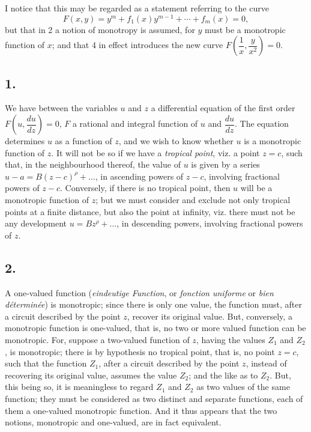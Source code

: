 \documentclass[11pt,a4paper]{article}
\theoremstyle{definition}
\begin{document}
I notice that this may be regarded as a statement referring to the curve
\[
F(x, y) = y^m + f_1(x)y^{m-1} + \cdots + f_m(x) = 0,
\]
but that in 2 a notion of monotropy is assumed, for $y$ must be a monotropic function of $x$; and that 4 in effect introduces the new curve $F\!\left(\dfrac{1}{x}, \dfrac{y}{x^2}\right) = 0$.

\subsection*{1.}

We have between the variables $u$ and $z$ a differential equation of the first order $F\!\left(u, \dfrac{du}{dz}\right) = 0$, $F$ a rational and integral function of $u$ and $\dfrac{du}{dz}$. The equation determines $u$ as a function of $z$, and we wish to know whether $u$ is a monotropic function of $z$. It will not be so if we have a \textit{tropical point}, viz. a point $z = c$, such that, in the neighbourhood thereof, the value of $u$ is given by a series $u - a = B(z - c)^\rho + \ldots$, in ascending powers of $z - c$, involving fractional powers of $z - c$. Conversely, if there is no tropical point, then $u$ will be a monotropic function of $z$; but we must consider and exclude not only tropical points at a finite distance, but also the point at infinity, viz. there must not be any development $u = Bz^\rho + \ldots$, in descending powers, involving fractional powers of $z$.

\subsection*{2.}

A one-valued function (\textit{eindeutige Function}, or \textit{fonction uniforme} or \textit{bien d\'etermin\'ee}) is monotropic; since there is only one value, the function must, after a circuit described by the point $z$, recover its original value. But, conversely, a monotropic function is one-valued, that is, no two or more valued function can be monotropic. For, suppose a two-valued function of $z$, having the values $Z_1$ and $Z_2$, is monotropic; there is by hypothesis no tropical point, that is, no point $z = c$, such that the function $Z_1$, after a circuit described by the point $z$, instead of recovering its original value, assumes the value $Z_2$; and the like as to $Z_2$. But, this being so, it is meaningless to regard $Z_1$ and $Z_2$ as two values of the same function; they must be considered as two distinct and separate functions, each of them a one-valued monotropic function. And it thus appears that the two notions, monotropic and one-valued, are in fact equivalent.
\end{document}

